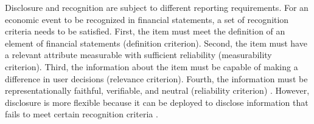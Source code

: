 \documentclass[letterpaper,12pt]{article}
\begin{document}
\begin{spacing}{1.5}
Disclosure and recognition are subject to different reporting requirements. For an economic event to be recognized in financial statements, a set of recognition criteria needs to be satisfied. First, the item must meet the definition of an element of financial statements (definition criterion). Second, the item must have a relevant attribute measurable with sufficient reliability (measurability criterion). Third, the information about the item must be capable of making a difference in user decisions (relevance criterion). Fourth, the information must be representationally faithful, verifiable, and neutral (reliability criterion) \cite{fasbStatementFinancialAccounting1984}. However, disclosure is more flexible because it can be deployed to disclose information that fails to meet certain recognition criteria \cite[par. 7b]{fasbStatementFinancialAccounting1984}. 


\end{spacing}
\end{document}
